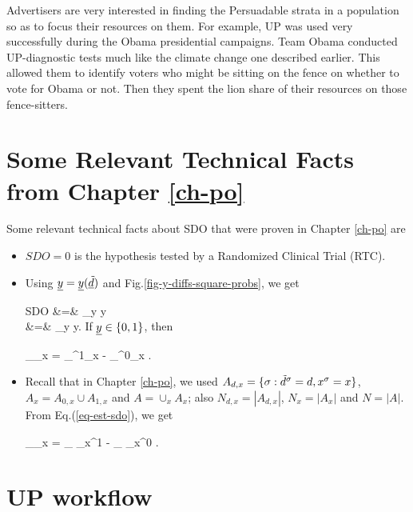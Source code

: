 Advertisers are very interested in finding
the Persuadable strata in a population
so as to focus their resources on them.
For example, UP was used very
successfully during the 
Obama presidential campaigns. 
Team Obama conducted UP-diagnostic
tests much like
the climate change one described earlier.
This allowed them to
identify voters who might be sitting on the fence
on whether to vote for Obama or not.
Then they spent
the lion share
of their resources  on those
fence-sitters.


\section{Some Relevant Technical Facts from Chapter \ref{ch-po}}
Some relevant technical facts
about SDO
that were proven in Chapter \ref{ch-po} are

\begin{itemize}
\item
$SDO=0$ is the hypothesis tested 
by a Randomized Clinical Trial (RTC). 

\item
Using ${\underline{y}}={\underline{y}}({\underline{\tilde{d}}})$
and Fig.\ref{fig-y-diffs-square-probs},
we get

\beqa
SDO &=& \sum_y y
\\
&=&
\sum_y y
\;.
\eeqa
If ${\underline{y}}\in \{0,1\}$, then

\beq
{}_{\displaystyle \delta_x}
=
_{\displaystyle \pi^1_x}
-
_{\displaystyle \pi^0_x}
\;.
\eeq

\item
Recall that in
Chapter \ref{ch-po}, we used 
$A_{d, x}=\{\sigma:{\tilde{d}}^\sigma=d,x^\sigma=x\}$,
$A_x=A_{0,x}\cup A_{1,x}$ and $A=\cup_x A_x$; also
$N_{d,x}=|A_{d,x}|$, $N_x=|A_x|$ and $N=|A|$.
From
Eq.(\ref{eq-est-sdo}),
we get


\beq
{}_{\displaystyle\delta_x}
=
_
{\displaystyle \pi_x^1}
-
_
{\displaystyle \pi_x^0}
\;.
\label{eq-est-sdo-uplift}
\eeq

\end{itemize}


\section{UP workflow}

